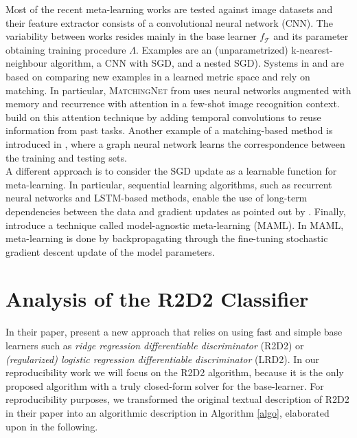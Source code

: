 Most of the recent meta-learning works are tested against image datasets and their feature extractor consists of a convolutional neural network (CNN). The variability between works resides mainly in the base learner $f_\mathcal{T}$ and its parameter obtaining training procedure $\Lambda$. Examples are an (unparametrized) k-nearest-neighbour algorithm\supercite{vinyals}, a CNN with SGD\supercite{mishra}, and a nested SGD\supercite{finn}). Systems in \citet{vinyals} and \citet{snell} are based on comparing new examples in a learned metric space and rely on matching. In particular, \textsc{MatchingNet} from \citet{vinyals} uses neural networks augmented with memory and recurrence with attention in a few-shot image recognition context. \citet{mishra} build on this attention technique by adding temporal convolutions to reuse information from past tasks. Another example of a matching-based method is introduced in \citet{garcia}, where a graph neural network learns the correspondence between the training and testing sets.\\

A different approach is to consider the SGD update as a learnable function for meta-learning. In particular, sequential learning algorithms, such as recurrent neural networks and LSTM-based methods, enable the use of long-term dependencies between the data and gradient updates as pointed out by \citet{ravi}. Finally, \citet{finn} introduce a technique called model-agnostic meta-learning (MAML). In MAML, meta-learning is done by backpropagating through the fine-tuning stochastic gradient descent update of the model parameters.

\section{Analysis of the R2D2 Classifier}
\label{Anal}
In their paper, \citet{R2D2} present a new approach that relies on using fast and simple base learners such as \textit{ridge regression differentiable discriminator} (R2D2) or \textit{(regularized) logistic regression differentiable discriminator} (LRD2). In our reproducibility work we will focus on the R2D2 algorithm, because it is the only proposed algorithm with a truly closed-form solver for the base-learner. For reproducibility purposes, we transformed the original textual description of R2D2 in their paper into an algorithmic description in Algorithm \ref{algo}, elaborated upon in the following.\\

